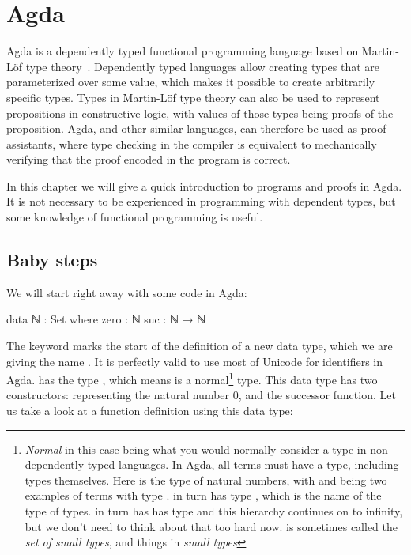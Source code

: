 
\chapter{Agda} \label{Agda}

	Agda is a dependently typed functional programming language based on
	Martin-Löf type theory~\cite{martin84}. Dependently typed languages allow
	creating types that are parameterized over some value, which makes it
	possible to create arbitrarily specific types. Types in Martin-Löf type
	theory can also be used to represent propositions in constructive logic,
	with values of those types being proofs of the proposition. Agda, and other
	similar languages, can therefore be used as proof assistants, where type
	checking in the compiler is equivalent to mechanically verifying that the
	proof encoded in the program is correct.

	In this chapter we will give a quick introduction to programs and proofs in
	Agda. It is not necessary to be experienced in programming with dependent
	types, but some knowledge of functional programming is useful.

	\section{Baby steps}

		We will start right away with some code in Agda:

		\begin{code}
			data ℕ : Set where
			  zero : ℕ
			  suc : ℕ → ℕ
		\end{code}

		The keyword  marks the start of the definition of a new
		data type, which we are giving the name . It is perfectly
		valid to use most of Unicode for identifiers in Agda.  has
		the type , which means  is a normal\footnote{
		\emph{Normal} in this case being what you would normally consider a
		type in non-dependently typed languages. In Agda, all terms must have a
		type, including types themselves. Here  is the type of
		natural numbers, with  and  being
		two examples of terms with type .  in turn has type
		, which is the name of the type of types.   in
		turn has has type  and this hierarchy continues on to
		infinity, but we don't need to think about that too hard now.
		 is sometimes called the \emph{set of small types}, and
		things in  \emph{small types}} type. This data type has two
		constructors:  representing the natural number $0$, and
		 the successor function. Let us take a look at a function
		definition using this data type:

